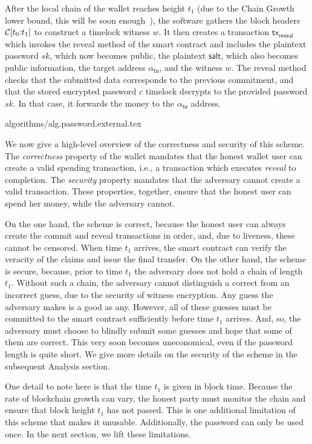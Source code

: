 After the local chain of the wallet reaches height $t_1$ (due to the Chain Growth lower bound, this
will be soon enough~\cite{backbone}), the software gathers the block headers
$\mathcal{C}[t_0{:}t_1]$ to construct a timelock witness $w$. It then creates a transaction
$\textsf{tx}_\textsf{reveal}$ which invokes the \textsf{reveal} method of the smart contract
and includes the plaintext password $sk$, which now becomes public, the plaintext
$\textsf{salt}$, which also becomes public information, the target address $\alpha_{\textsf{to}}$, and
the witness $w$. The \textsf{reveal} method checks that the submitted data corresponds to the
previous commitment, and that the stored encrypted password $c$ timelock decrypts to the provided
password $sk$. In that case, it forwards the money to the $\alpha_{\textsf{to}}$ address.

{algorithms/alg.password.external.tex}

We now give a high-level overview of the correctness and security of this scheme.
The \emph{correctness} property of the wallet mandates that the honest wallet user can
create a valid spending transaction, i.e., a transaction which executes
\emph{reveal} to completion. The \emph{security} property mandates that the adversary
cannot create a valid transaction. These properties, together, ensure that the honest user
can spend her money, while the adversary cannot.

On the one hand, the scheme is correct, because the honest user can always create the commit
and reveal transactions in order, and, due to liveness, these cannot be censored. When time
$t_1$ arrives, the smart contract can verify the veracity of the claims and issue the final
transfer. On the other hand, the scheme is secure, because, prior to time $t_1$ the adversary
does not hold a chain of length $t_1$. Without such a chain, the adversary cannot distinguish
a correct from an incorrect guess, due to the security of witness encryption. Any guess the
adversary makes is a good as any. However, all of these guesses must be committed to the smart
contract sufficiently before time $t_1$ arrives. And, so, the adversary must choose to blindly
submit some guesses and hope that some of them are correct. This very soon becomes uneconomical,
even if the password length is quite short. We give more details on the security of the scheme
in the subsequent Analysis section.

One detail to note here is that the time $t_1$ is given in block time. Because the rate of
blockchain growth can vary, the honest party must monitor the chain and ensure that block
height $t_1$ has not passed. This is one additional limitation of this scheme that makes it
unusable. Additionally, the password can only be used once.
In the next section, we lift these limitations.
